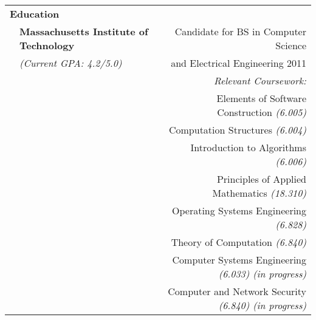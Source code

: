 \documentclass{article}
\begin{document}
\begin{tabular}{llr}

\multicolumn{2}{l}{{\large \bf Education} \vspace{1mm}}& \\
& {\bf Massachusetts Institute of Technology} & Candidate for BS in Computer Science\\
& {\it (Current GPA: 4.2/5.0)} & \vspace{1mm} and Electrical Engineering 2011\\
& & {\it Relevant Coursework: } \\
& & Elements of Software Construction {\it (6.005)}\\
& & Computation Structures {\it (6.004)}\\
& & Introduction to Algorithms {\it (6.006)}\\
& & Principles of Applied Mathematics {\it (18.310)}\\
& & Operating Systems Engineering {\it (6.828)}\\
& & Theory of Computation {\it (6.840)}\\
& & Computer Systems Engineering {\it (6.033) (in progress)}\\
& & Computer and Network Security {\it (6.840) (in progress)}\\


\end{tabular}
\end{document}
